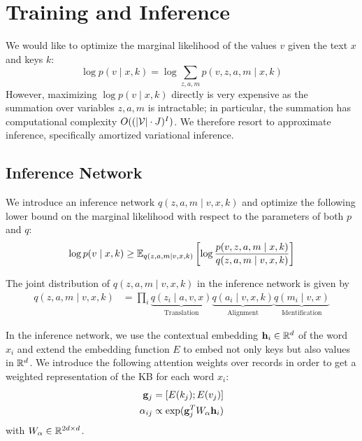 \documentclass[12pt]{article}
\begin{document}
\section{Training and Inference}
We would like to optimize the marginal likelihood of the values $v$ given the 
text $x$ and keys $k$:
\begin{equation}
\log p(v \mid x,k) = \log \sum_{z,a,m} p(v,z,a,m \mid x,k)
\end{equation}
However, maximizing $\log p(v \mid x,k)$ directly is very expensive 
as the summation over variables $z,a,m$ is intractable;
in particular,
the summation has computational complexity $O((|\mathcal{V}|\cdot J)^{I})$.
We therefore resort to approximate inference,
specifically amortized variational inference.

\subsection{Inference Network}
We introduce an inference network $q(z,a,m\mid v,x,k)$
and optimize the following lower bound on the marginal likelihood
with respect to the parameters of both $p$ and $q$:
\begin{equation}
\label{eqn:lowerbound}
\log p(v\mid x,k) \geq
\mathbb{E}_{q(z,a,m\mid v,x,k)}\left[\log \frac{p(v,z,a,m\mid x,k)}{q(z,a,m\mid v,x,k)}\right]
\end{equation}

The joint distribution of $q(z,a,m\mid v,x,k)$ in the inference network is given by
\begin{equation}
\label{eqn:elbo}
\begin{aligned}
q(z,a,m\mid v,x,k) &= \prod_i
    \underbrace{q(z_i \mid a,v,x)}_{\textrm{Translation}}
    \underbrace{q(a_i \mid v,x,k)}_{\textrm{Alignment}}
    \underbrace{q(m_i \mid v,x)}_{\textrm{Identification}}
\end{aligned}
\end{equation}

In the inference network,
we use the contextual embedding $\mathbf{h}_i \in \mathbb{R}^d$ of the word $x_i$
and extend the embedding function $E$ to embed not only keys but also values in $\mathbb{R}^d$.
We introduce the following attention weights over records
in order to get a weighted representation of the KB for each word $x_i$:
\begin{equation}
\label{eqn:attn}
\begin{aligned}
\mathbf{g}_j &= [E(k_j); E(v_j)]\\
\alpha_{ij} &\propto \exp(\mathbf{g}_{j}^T W_\alpha \mathbf{h}_i)
\end{aligned}
\end{equation}
with $W_\alpha \in \mathbb{R}^{2d \times d}$.
\end{document}

